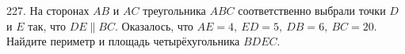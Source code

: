 227. На сторонах $AB$ и $AC$ треугольника $ABC$ соответственно выбрали точки $D$ и $E$ так, что $DE\parallel BC.$ Оказалось, что $AE=4,\ ED=5,\ DB=6,\ BC=20.$ Найдите периметр и площадь четырёхугольника $BDEC.$\\
